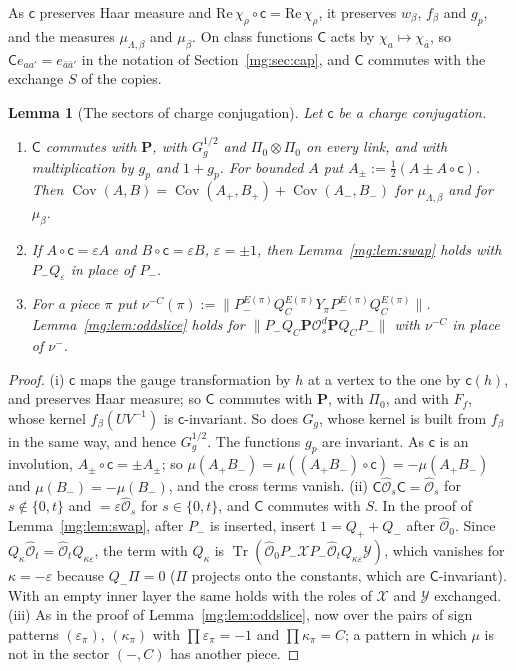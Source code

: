 \documentclass[11pt,a4paper]{article}
\newtheorem{lemma}[theorem]{Lemma}
\theoremstyle{definition}
\theoremstyle{remark}
\DeclareMathOperator{\Tr}{Tr}
\DeclareMathOperator{\Cov}{Cov}
\newcommand{\norm}[1]{\lVert #1\rVert}
\begin{document}
As $\mathsf c$ preserves Haar measure and $\mathrm{Re}\,\chi_\rho\circ\mathsf c=\mathrm{Re}\,\chi_\rho$, it preserves $w_\beta$, $f_\beta$ and $g_p$, and the measures
$\mu_{\Lambda,\beta}$ and $\mu_\beta$. On class functions $\mathsf C$ acts by $\chi_a\mapsto\chi_{\bar a}$, so $\mathsf Ce_{aa'}=e_{\bar a\bar a'}$ in the notation of
Section~\ref{mg:sec:cap}, and $\mathsf C$ commutes with the exchange $S$ of the copies.

\begin{lemma}[The sectors of charge conjugation]\label{mg:lem:csectors}
Let $\mathsf c$ be a charge conjugation.
\begin{enumerate}[label=(\roman*)]
\item $\mathsf C$ commutes with $\mathbf P$, with $G_g^{1/2}$ and $\Pi_0\otimes\Pi_0$ on every link, and with multiplication by $g_p$ and $1+g_p$. For bounded $A$
put $A_\pm:=\frac12(A\pm A\circ\mathsf c)$. Then $\Cov(A,B)=\Cov(A_+,B_+)+\Cov(A_-,B_-)$ for $\mu_{\Lambda,\beta}$ and for $\mu_\beta$.
\item If $A\circ\mathsf c=\varepsilon A$ and $B\circ\mathsf c=\varepsilon B$, $\varepsilon=\pm1$, then Lemma~\ref{mg:lem:swap} holds with $P_-Q_\varepsilon$ in place of $P_-$.
\item For a piece $\pi$ put $\nu^{-C}(\pi):=\norm{P^{E(\pi)}_-Q^{E(\pi)}_CY_\pi P^{E(\pi)}_-Q^{E(\pi)}_C}$. Lemma~\ref{mg:lem:oddslice} holds for
$\norm{P_-Q_C\mathbf P\mathcal O^d_s\mathbf PQ_CP_-}$ with $\nu^{-C}$ in place of $\nu^-$.
\end{enumerate}
\end{lemma}

\begin{proof}
(i) $\mathsf c$ maps the gauge transformation by $h$ at a vertex to the one by $\mathsf c(h)$, and preserves Haar measure; so $\mathsf C$ commutes with
$\mathbf P$, with $\Pi_0$, and with $F_f$, whose kernel $f_\beta(UV^{-1})$ is $\mathsf c$-invariant. So does $G_g$, whose kernel is built from $f_\beta$ in the same way, and hence $G_g^{1/2}$. The functions $g_p$ are invariant. As $\mathsf c$ is an
involution, $A_\pm\circ\mathsf c=\pm A_\pm$; so $\mu(A_+B_-)=\mu((A_+B_-)\circ\mathsf c)=-\mu(A_+B_-)$ and $\mu(B_-)=-\mu(B_-)$, and the cross terms vanish. (ii) $\mathsf C\hat{\mathcal O}_s\mathsf C=\hat{\mathcal O}_s$ for $s\notin\{0,t\}$ and
$=\varepsilon\hat{\mathcal O}_s$ for $s\in\{0,t\}$, and $\mathsf C$ commutes with $S$. In the proof of Lemma~\ref{mg:lem:swap}, after $P_-$ is inserted, insert
$1=Q_++Q_-$ after $\hat{\mathcal O}_0$. Since $Q_\kappa\hat{\mathcal O}_t=\hat{\mathcal O}_tQ_{\kappa\varepsilon}$, the term with $Q_\kappa$ is
$\Tr(\hat{\mathcal O}_0P_-\mathcal XP_-\hat{\mathcal O}_tQ_{\kappa\varepsilon}\mathcal Y)$, which vanishes for $\kappa=-\varepsilon$ because $Q_-\Pi=0$ ($\Pi$ projects
onto the constants, which are $\mathsf C$-invariant). With an empty inner layer the same holds with the roles of $\mathcal X$ and $\mathcal Y$ exchanged.
(iii) As in the proof of Lemma~\ref{mg:lem:oddslice}, now over the pairs of sign patterns $(\varepsilon_\pi)$, $(\kappa_\pi)$ with $\prod\varepsilon_\pi=-1$ and
$\prod\kappa_\pi=C$; a pattern in which $\mu$ is not in the sector $(-,C)$ has another piece.
\end{proof}
\end{document}
